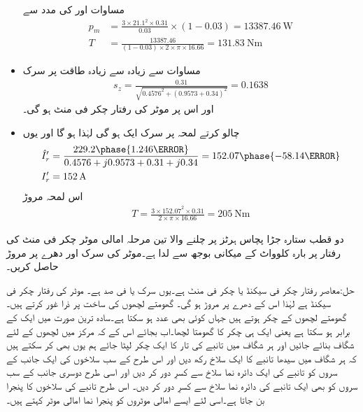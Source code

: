 \begin{itemize}
مساوات   اور   کی مدد سے
\begin{align*}
p_m&=\frac{3\times 21.1^2\times 0.31}{0.03} \times (1-0.03)=\SI{13387.46}{\watt}\\
T&=\frac{13387.46}{(1-0.03) \times 2\times \pi \times 16.66}=\SI{131.83}{\newton \meter}
\end{align*}
%
\item
مساوات   سے زیادہ سے زیادہ طاقت پر سرک
\begin{align*}
s_z=\frac{0.31}{\sqrt{0.4576^2+(0.9573+0.34)^2}}=0.1638
\end{align*}
اور اس پر موٹر کی رفتار  چکر فی منٹ ہو گی۔
\item
چالو کرتے لمحہ پر سرک ایک ہو گی لہٰذا  ہو گا اور یوں
\begin{align*}
\hat{I}_r'&=\frac{229.2 \phase{1.246\degree}}{0.4576+j 0.9573+0.31+j 0.34}=152.07\phase{-58.14\degree}\\
I_r'&=\SI{152}{\ampere}
\end{align*}
اس لمحہ مروڑ
\begin{align*}
T=\frac{3 \times 152.07^2 \times 0.31}{2 \times \pi \times 16.66}=\SI{205}{\newton \meter}
\end{align*}
\end{itemize}
%
دو قطب ستارہ جڑا پچاس ہرٹز پر چلنے والا تین مرحلہ امالی موٹر   چکر فی منٹ کی رفتار پر بارہ کلوواٹ کے میکانی بوجھ سے لدا ہے۔موٹر کی سرک اور دھرے پر مروڑ  حاصل کریں۔

حل:معاصر رفتار  چکر فی سیکنڈ یا  چکر فی منٹ ہے۔یوں سرک   یا  فی صد ہے۔ موٹر کی رفتار   چکر فی سیکنڈ ہے لہٰذا اس کے  دھرے پر مروڑ   ہو گی۔
%
گھومتے لچھوں کی ساخت پر ذرا غور کرتے ہیں۔ گھومتے لچھوں کے   چکر ہوتے ہیں جہاں  کوئی بھی عدد ہو سکتا ہے۔سادہ ترین صورت میں   ایک کے برابر ہو سکتا ہے یعنی ایک ہی چکر کا گھومتا لچھا۔اب بجائے اس کے کہ مرکز میں لچھوں کے لئے شگاف بنائے جائیں اور ہر شگاف میں تانبے کی تار کا ایک چکر لپٹا جائے ہم یوں بھی کر سکتے ہیں کہ ہر شگاف میں سیدھا تانبے کا ایک سلاخ رکھ دیں اور اس طرح کے سب سلاخوں کی ایک جانب کے سروں کو تانبے کی ایک دائرہ نما سلاخ سے کسرِ دور کر دیں اور اسی طرح دوسری جانب کے سب سروں کو بھی ایک تانبے کی دائرہ نما سلاخ سے کسرِ  دور کر دیں۔ اس طرح تانبے کی سلاخوں کا پنجرا بن جاتا ہے۔اسی لئے ایسے امالی موٹروں کو پنجرا نما امالی موٹر کہتے ہیں۔

